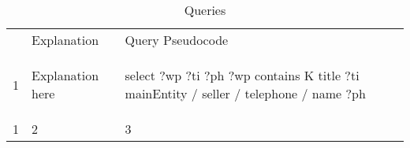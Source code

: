 

\begin{table} 
\begin{tabular}{ l l l }
 & Explanation & Query Pseudocode\\ 
%
1 & Explanation here & 
\begin{sparqlmini}
select ?wp ?ti ?ph
   ?wp contains K
      title ?ti
      mainEntity / seller / telephone / name ?ph
\end{sparqlmini}\\
1&2&3
%
\end{tabular} 
    \caption{Queries} 
\end{table}


